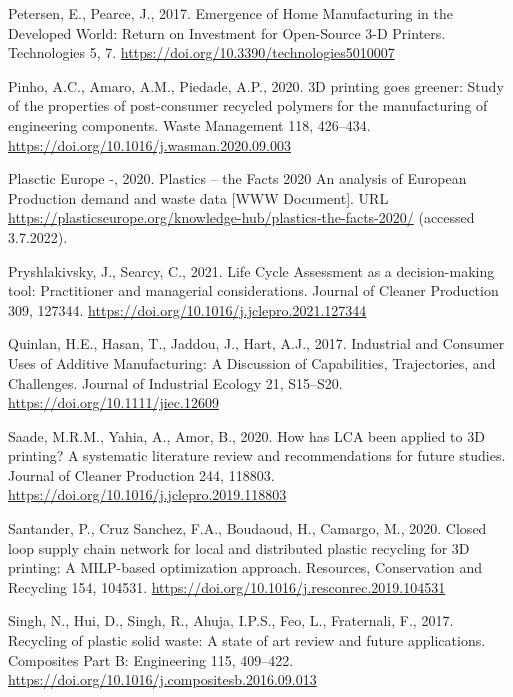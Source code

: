 \documentclass[12pt]{elsarticle} %
\newlength{\cslhangindent}
\newlength{\cslentryspacingunit} %
\newenvironment{CSLReferences}[2] %
 {%
  \setlength{\parindent}{0pt}
  \ifodd #1
  \let\oldpar\par
  \def\par{\hangindent=\cslhangindent\oldpar}
  \fi
  \setlength{\parskip}{#2\cslentryspacingunit}
 }%
 {}
\begin{document}
\begin{CSLReferences}{1}{0}
\leavevmode{}%
Petersen, E., Pearce, J., 2017. Emergence of {Home Manufacturing} in the {Developed World}: {Return} on {Investment} for {Open-Source} 3-{D Printers}. Technologies 5, 7. \url{https://doi.org/10.3390/technologies5010007}

\leavevmode{}%
Pinho, A.C., Amaro, A.M., Piedade, A.P., 2020. {3D} printing goes greener: {Study} of the properties of post-consumer recycled polymers for the manufacturing of engineering components. Waste Management 118, 426--434. \url{https://doi.org/10.1016/j.wasman.2020.09.003}

\leavevmode{}%
Plasctic Europe -, 2020. Plastics -- the {Facts} 2020 {An} analysis of {European Production} demand and waste data {[}WWW Document{]}. URL \url{https://plasticseurope.org/knowledge-hub/plastics-the-facts-2020/} (accessed 3.7.2022).

\leavevmode{}%
Pryshlakivsky, J., Searcy, C., 2021. Life {Cycle Assessment} as a decision-making tool: {Practitioner} and managerial considerations. Journal of Cleaner Production 309, 127344. \url{https://doi.org/10.1016/j.jclepro.2021.127344}

\leavevmode{}%
Quinlan, H.E., Hasan, T., Jaddou, J., Hart, A.J., 2017. Industrial and {Consumer Uses} of {Additive Manufacturing}: {A Discussion} of {Capabilities}, {Trajectories}, and {Challenges}. Journal of Industrial Ecology 21, S15--S20. \url{https://doi.org/10.1111/jiec.12609}

\leavevmode{}%
Saade, M.R.M., Yahia, A., Amor, B., 2020. How has {LCA} been applied to {3D} printing? {A} systematic literature review and recommendations for future studies. Journal of Cleaner Production 244, 118803. \url{https://doi.org/10.1016/j.jclepro.2019.118803}

\leavevmode{}%
Santander, P., Cruz Sanchez, F.A., Boudaoud, H., Camargo, M., 2020. Closed loop supply chain network for local and distributed plastic recycling for {3D} printing: A {MILP-based} optimization approach. Resources, Conservation and Recycling 154, 104531. \url{https://doi.org/10.1016/j.resconrec.2019.104531}

\leavevmode{}%
Singh, N., Hui, D., Singh, R., Ahuja, I.P.S., Feo, L., Fraternali, F., 2017. Recycling of plastic solid waste: {A} state of art review and future applications. Composites Part B: Engineering 115, 409--422. \url{https://doi.org/10.1016/j.compositesb.2016.09.013}


\end{CSLReferences}
\end{document}
